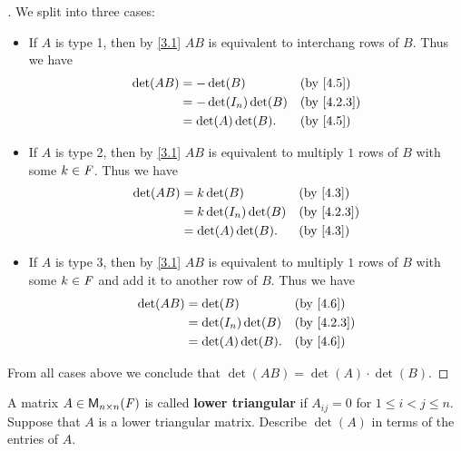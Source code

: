 \begin{proof}[]
	We split into three cases:
	\begin{itemize}
		\item If \(A\) is type 1, then by \cref{3.1} \(AB\) is equivalent to interchang rows of \(B\).
		      Thus we have
		      \begin{align*}
			      \det(AB) & = -\det(B)           &  & \by{4.5}   \\
			               & = -\det(I_n) \det(B) &  & \by{4.2.3} \\
			               & = \det(A) \det(B).   &  & \by{4.5}
		      \end{align*}
		\item If \(A\) is type 2, then by \cref{3.1} \(AB\) is equivalent to multiply \(1\) rows of \(B\) with some \(k \in \mathit{F}\).
		      Thus we have
		      \begin{align*}
			      \det(AB) & = k \det(B)           &  & \by{4.3}   \\
			               & = k \det(I_n) \det(B) &  & \by{4.2.3} \\
			               & = \det(A) \det(B).    &  & \by{4.3}
		      \end{align*}
		\item If \(A\) is type 3, then by \cref{3.1} \(AB\) is equivalent to multiply \(1\) rows of \(B\) with some \(k \in \mathit{F}\) and add it to another row of \(B\).
		      Thus we have
		      \begin{align*}
			      \det(AB) & = \det(B)           &  & \by{4.6}   \\
			               & = \det(I_n) \det(B) &  & \by{4.2.3} \\
			               & = \det(A) \det(B).  &  & \by{4.6}
		      \end{align*}
	\end{itemize}
	From all cases above we conclude that \(\det(AB) = \det(A) \cdot \det(B)\).
\end{proof}

\begin{ex}\label{ex:4.3.19}
	A matrix \(A \in \mathsf{M}_{{n} \times n}({\mathit{F}})\) is called \textbf{lower triangular} if \(A_{i j} = 0\) for \(1 \leq i < j \leq n\).
	Suppose that \(A\) is a lower triangular matrix.
	Describe \(\det(A)\) in terms of the entries of \(A\).
\end{ex}

